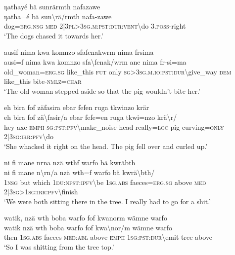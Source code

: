 \ea\label{ex:14:a2979}
ŋathayé bä sunrärmth nafazawe\\
\gll ŋatha=é	bä	sun{\textbackslash}rä/rmth	nafa-zawe\\
     dog=\textsc{erg}.\textsc{nsg}	\textsc{med}	2|3\textsc{pl}>3\textsc{sg}.\textsc{m}:\textsc{pst}:\textsc{dur}:\textsc{vent}{\textbackslash}do	3.\textsc{poss}-right\\
\glt `The dogs chased it towards her.'
\z

\ea\label{ex:14:a2980}
ausif nima kwa komnzo sfafenakwrm nima frsima\\
\gll ausi=f	nima	kwa	komnzo	sfa{\textbackslash}fenak/wrm	ane	nima	fr-si=ma\\
     old\_woman=\textsc{erg}.\textsc{sg}	like\_this	\textsc{fut}	only	\textsc{sg}>3\textsc{sg}.\textsc{m}.\textsc{io}:\textsc{pst}:\textsc{dur}{\textbackslash}give\_way	\textsc{dem}	like\_this	bite-\textsc{nmlz}=\textsc{char}\\
\glt `The old woman stepped aside so that the pig wouldn't bite her.'
\z

\ea\label{ex:14:a2982}
eh bira fof zäfasira ebar fefen ruga tkwinzo krär\\
\gll eh	bira	fof	zä{\textbackslash}fasir/a	ebar	fefe=en	ruga	tkwi=nzo	krä{\textbackslash}r/\\
     hey	axe	\textsc{emph}	\textsc{sg}:\textsc{pst}:\textsc{pfv}{\textbackslash}make\_noise	head	really=\textsc{loc}	pig	curving=\textsc{only}	2|3\textsc{sg}:\textsc{irr}:\textsc{pfv}{\textbackslash}do\\
\glt `She whacked it right on the head. The pig fell over and curled up.'
\z

\ea\label{ex:14:a2984}
ni fi mane nrna nzä wthf warfo bä kwräbth\\
\gll ni	fi	mane	n{\textbackslash}rn/a	nzä	wth=f	warfo	bä	kwrä{\textbackslash}bth/\\
     1\textsc{nsg}	but	which	1\textsc{du}:\textsc{npst}:\textsc{ipfv}{\textbackslash}be	1\textsc{sg}.\textsc{abs}	faeces=\textsc{erg}.\textsc{sg}	above	\textsc{med}	2|3\textsc{sg}>1\textsc{sg}:\textsc{irr}:\textsc{pfv}{\textbackslash}finish\\
\glt `We were both sitting there in the tree. I really had to go for a shit.'
\z

\newpage
\ea\label{ex:14:a2986}
watik, nzä wth boba warfo fof kwanorm wämne warfo\\
\gll watik	nzä	wth	boba	warfo	fof	kwa{\textbackslash}nor/m	wämne	warfo\\
     then	1\textsc{sg}.\textsc{abs}	faeces	\textsc{med}:\textsc{abl}	above	\textsc{emph}	1\textsc{sg}:\textsc{pst}:\textsc{dur}{\textbackslash}emit	tree	above\\
\glt `So I was shitting from the tree top.'
\z

